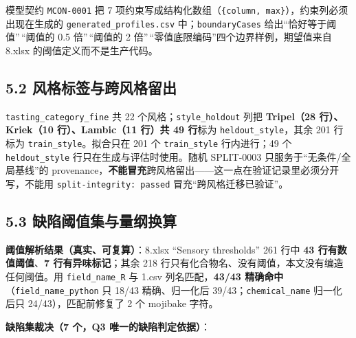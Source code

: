 \documentclass[
  11pt,
]{ctexart}
\begin{document}
模型契约 \texttt{MCON-0001} 把 7
项约束写成结构化数组（\texttt{\{column,\ max\}}），约束列必须出现在生成的
\texttt{generated\_\allowbreak{}profiles.\allowbreak{}csv} 中；\texttt{boundaryCases}
给出``恰好等于阈值''\,``阈值的 0.5 倍''\,``阈值的 2
倍''\,``零值底限编码''四个边界样例，期望值来自 8.xlsx
的阈值定义而不是生产代码。

\subsection{5.2
风格标签与跨风格留出}\label{ux98ceux683cux6807ux7b7eux4e0eux8de8ux98ceux683cux7559ux51fa}

\texttt{tasting\_\allowbreak{}category\_\allowbreak{}fine} 共 22 个风格；\texttt{style\_\allowbreak{}holdout}
列把 \textbf{Tripel（28 行）、Kriek（10 行）、Lambic（11 行）共 49
行}标为 \texttt{heldout\_\allowbreak{}style}，其余 201 行标为
\texttt{train\_style}。拟合只在 201 个 \texttt{train\_style}
行内进行；49 个 \texttt{heldout\_\allowbreak{}style} 行只在生成与评估时使用。随机
SPLIT-0003 只服务于``无条件/全局基线''的
provenance，\textbf{不能冒充}跨风格留出------这一点在验证记录里必须分开写，不能用
\texttt{split-integrity:\ passed} 冒充``跨风格迁移已验证''。

\subsection{5.3
缺陷阈值集与量纲换算}\label{ux7f3aux9677ux9608ux503cux96c6ux4e0eux91cfux7eb2ux6362ux7b97}

\textbf{阈值解析结果（真实、可复算）}：8.xlsx ``Sensory thresholds'' 261
行中 \textbf{43 行有数值阈值}、\textbf{7 行有异味标记}；其余 218
行只有化合物名、没有阈值，本文没有编造任何阈值。用
\texttt{field\_\allowbreak{}name\_\allowbreak{}R} 与 1.csv 列名匹配，\textbf{43/43
精确命中}（\texttt{field\_\allowbreak{}name\_\allowbreak{}python} 只 18/43 精确、归一化后
39/43；\texttt{chemical\_\allowbreak{}name} 归一化后只 24/43），匹配前修复了 2 个
mojibake 字符。

\textbf{缺陷集裁决（7 个，Q3 唯一的缺陷判定依据）}：
\end{document}

